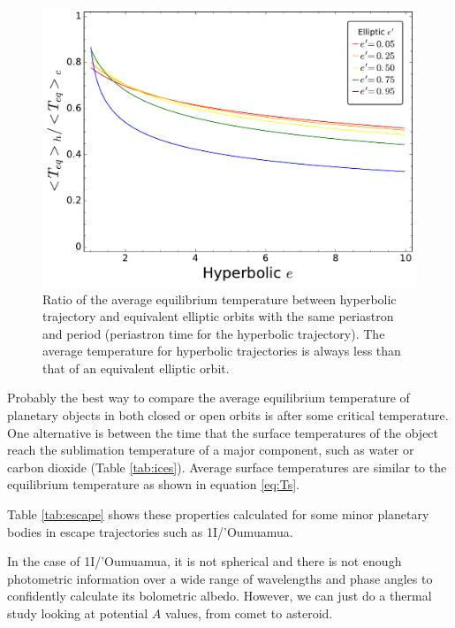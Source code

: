 \documentclass[a4paper,fleqn,usenatbib]{mnras}
\begin{document}
\begin{figure}
\includegraphics[width=\columnwidth]{f4.pdf}
\caption{Ratio of the average equilibrium temperature between hyperbolic trajectory and equivalent elliptic orbits with the same periastron and period (periastron time for the hyperbolic trajectory). The average temperature for hyperbolic trajectories is always less than that of an equivalent elliptic orbit.}
\label{fig4}
\end{figure}


Probably the best way to compare the average equilibrium temperature of planetary objects in both closed or open orbits is after some critical temperature. One alternative is between the time that the surface temperatures of the object reach the sublimation temperature of a major component, such as water or carbon dioxide (Table \ref{tab:ices}). Average surface temperatures are similar to the equilibrium temperature as shown in equation \ref{eq:Ts}.

Table \ref{tab:escape} shows these properties calculated for some minor planetary bodies in escape trajectories such as 1I/'Oumuamua.


In the case of 1I/'Oumuamua, it is not spherical and there is not enough photometric information over a wide range of wavelengths and phase angles to confidently calculate its bolometric albedo. However, we can just do a thermal study looking at potential $A$ values, from comet to asteroid.
\end{document}
